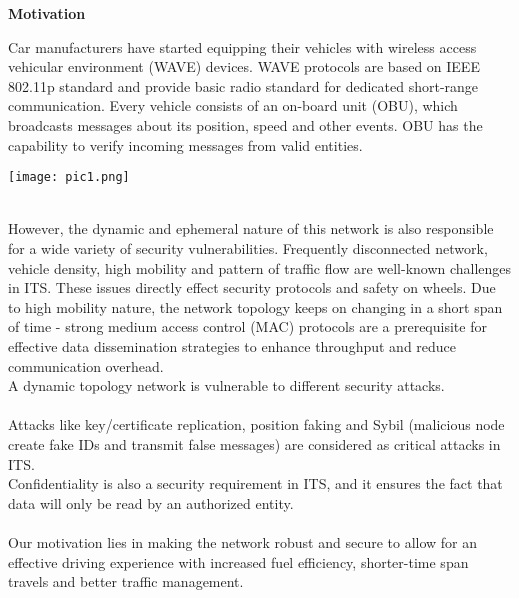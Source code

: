 \documentclass[a4paper,14pt]{extarticle}
\begin{document}
\newpage
\begin{center}
    {\LARGE \textbf{Motivation}} \\
    \vspace{1cm}
\end{center}
Car manufacturers have started equipping their vehicles with wireless access vehicular environment (WAVE) devices. WAVE protocols are based on IEEE 802.11p standard and provide basic radio standard for dedicated short-range communication.
Every vehicle consists of an on-board unit (OBU), which broadcasts messages about its position, speed and other events. OBU has the capability to verify incoming messages from valid entities.
\\
\begin{center}
    \texttt{[image: pic1.png]}
\end{center}
\\
However, the dynamic and ephemeral nature of this network is also responsible for a wide variety of security vulnerabilities.
Frequently disconnected network, vehicle density, high mobility and pattern of traffic flow are well-known challenges in ITS. These issues directly effect security protocols and safety on wheels.
Due to high mobility nature, the network topology keeps on changing in a short span of time - strong medium access control (MAC) protocols are a prerequisite for effective data dissemination strategies to enhance throughput and reduce communication overhead. 
\\
A dynamic topology network is vulnerable to different security attacks.
\\ \\ 
Attacks like key/certificate replication, position faking and Sybil (malicious node create fake IDs and transmit false messages) are considered as critical attacks in ITS. 
\\
Confidentiality is also a security requirement in ITS, and it ensures the fact that data will only be read by an authorized entity.
\\
\\
Our motivation lies in making the network robust and secure to allow for an effective driving experience with increased fuel efficiency, shorter-time span travels and better traffic management. 
\vspace{2cm}
\end{document}
